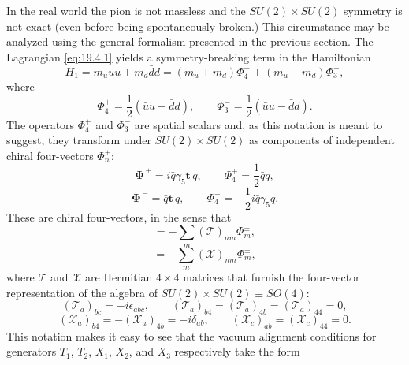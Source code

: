 In the real world the pion is not massless and the $SU(2)\times SU(2)$ symmetry is not exact (even before being spontaneously broken.) This circumstance may be analyzed using the general formalism presented in the previous section. The Lagrangian \eqref{eq:19.4.1} yields a symmetry-breaking term in the Hamiltonian
\begin{equation}
H_1=m_u\bar u u+m_d\bar d d
=(m_u+m_d)\Phi_4^+
+(m_u-m_d)\Phi_3^-,
\tag{19.4.34}\label{eq:19.4.34}
\end{equation}
where
\begin{equation}
\Phi_4^+=\frac12(\bar u u+\bar d d),
\qquad
\Phi_3^-=\frac12(\bar u u-\bar d d).
\tag{19.4.35}\label{eq:19.4.35}
\end{equation}
The operators $\Phi_4^+$ and $\Phi_3^-$ are spatial scalars and, as this notation is meant to suggest, they transform under $SU(2)\times SU(2)$ as components of independent chiral four-vectors $\Phi_n^\pm$:
\begin{equation}
\boldsymbol{\Phi}^{\, +}=i\bar q\gamma_5\mathbf{t}\,q,
\qquad
\Phi_4^+=\frac12\bar q q,
\tag{19.4.36}\label{eq:19.4.36}
\end{equation}
\begin{equation}
\boldsymbol{\Phi}^{\, -}=\bar q\mathbf{t}\,q,
\qquad
\Phi_4^-=-\frac12i\bar q\gamma_5q.
\tag{19.4.37}\label{eq:19.4.37}
\end{equation}
These are chiral four-vectors, in the sense that
\begin{equation}
[\mathbf{T},\Phi_n^\pm]
=-\sum_m(\mathbf{\mathcal T})_{nm}\Phi_m^\pm,
\tag{19.4.38}\label{eq:19.4.38}
\end{equation}
\begin{equation}
[\mathbf{X},\Phi_n^\pm]
=-\sum_m(\mathbf{\mathcal X})_{nm}\Phi_m^\pm,
\tag{19.4.39}\label{eq:19.4.39}
\end{equation}
where $\mathbf{\mathcal T}$ and $\mathbf{\mathcal X}$ are Hermitian $4\times4$ matrices that furnish the four-vector representation of the algebra of $SU(2)\times SU(2)\equiv SO(4)$:
\begin{equation}
(\mathcal T_a)_{bc}=-i\epsilon_{abc},
\qquad
(\mathcal T_a)_{b4}=(\mathcal T_a)_{4b}
=(\mathcal T_a)_{44}=0,
\tag{19.4.40}\label{eq:19.4.40}
\end{equation}
\begin{equation}
(\mathcal X_a)_{b4}=-(\mathcal X_a)_{4b}=-i\delta_{ab},
\qquad
(\mathcal X_c)_{ab}=(\mathcal X_c)_{44}=0.
\tag{19.4.41}\label{eq:19.4.41}
\end{equation}
This notation makes it easy to see that the vacuum alignment conditions for generators $T_1$, $T_2$, $X_1$, $X_2$, and $X_3$ respectively take the form
